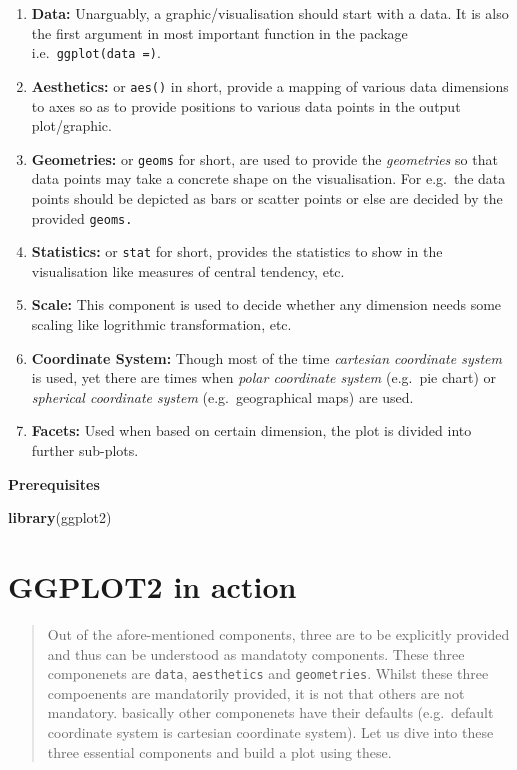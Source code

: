 \documentclass[
]{book}
\newenvironment{Shaded}{\begin{snugshade}}{\end{snugshade}}
\newcommand{\FunctionTok}[1]{\textcolor[rgb]{0.13,0.29,0.53}{\textbf{#1}}}
\newcommand{\NormalTok}[1]{#1}
\providecommand{\tightlist}{%
  \setlength{\itemsep}{0pt}\setlength{\parskip}{0pt}}
\begin{document}
\begin{enumerate}
\def\labelenumi{\arabic{enumi}.}
\tightlist
\item
  \textbf{Data:} Unarguably, a graphic/visualisation should start with a data. It is also the first argument in most important function in the package i.e.~\texttt{ggplot(data\ =)}.
\item
  \textbf{Aesthetics:} or \texttt{aes()} in short, provide a mapping of various data dimensions to axes so as to provide positions to various data points in the output plot/graphic.
\item
  \textbf{Geometries:} or \texttt{geoms} for short, are used to provide the \emph{geometries} so that data points may take a concrete shape on the visualisation. For e.g.~the data points should be depicted as bars or scatter points or else are decided by the provided \texttt{geoms.}
\item
  \textbf{Statistics:} or \texttt{stat} for short, provides the statistics to show in the visualisation like measures of central tendency, etc.
\item
  \textbf{Scale:} This component is used to decide whether any dimension needs some scaling like logrithmic transformation, etc.
\item
  \textbf{Coordinate System:} Though most of the time \emph{cartesian coordinate system} is used, yet there are times when \emph{polar coordinate system} (e.g.~pie chart) or \emph{spherical coordinate system} (e.g.~geographical maps) are used.
\item
  \textbf{Facets:} Used when based on certain dimension, the plot is divided into further sub-plots.
\end{enumerate}

\textbf{Prerequisites}

\begin{Shaded}
\begin{Highlighting}[]
\FunctionTok{library}\NormalTok{(ggplot2)}
\end{Highlighting}
\end{Shaded}

\hypertarget{ggplot2-in-action}{%
\section*{GGPLOT2 in action}\label{ggplot2-in-action}}

\begin{quote}
Out of the afore-mentioned components, three are to be explicitly provided and thus can be understood as mandatoty components. These three componenets are \texttt{data}, \texttt{aesthetics} and \texttt{geometries}. Whilst these three compoenents are mandatorily provided, it is not that others are not mandatory. basically other componenets have their defaults (e.g.~default coordinate system is cartesian coordinate system). Let us dive into these three essential components and build a plot using these.
\end{quote}
\end{document}
